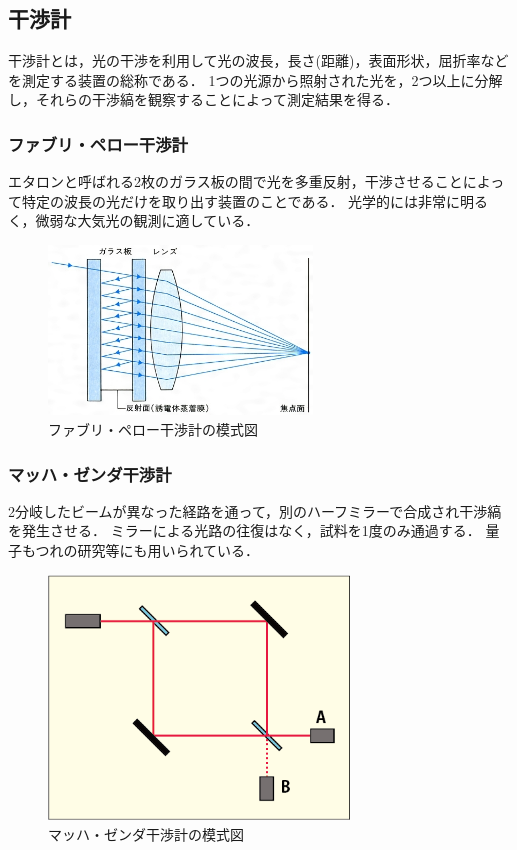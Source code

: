 \documentclass[a4paper]{ltjsarticle}
\begin{document}
	\subsection{干渉計}
		干渉計とは，光の干渉を利用して光の波長，長さ(距離)，表面形状，屈折率などを測定する装置の総称である．
		1つの光源から照射された光を，2つ以上に分解し，それらの干渉縞を観察することによって測定結果を得る．\cite{interference}
		\subsubsection{ファブリ・ペロー干渉計}
			エタロンと呼ばれる2枚のガラス板の間で光を多重反射，干渉させることによって特定の波長の光だけを取り出す装置のことである．
			光学的には非常に明るく，微弱な大気光の観測に適している．
			\begin{figure}[H]
				\centering
				\includegraphics[width=7cm]{fabry.jpg}
				\caption{ファブリ・ペロー干渉計の模式図}
			\end{figure}
		\subsubsection{マッハ・ゼンダ干渉計}
			2分岐したビームが異なった経路を通って，別のハーフミラーで合成され干渉縞を発生させる．
			ミラーによる光路の往復はなく，試料を1度のみ通過する．
			量子もつれの研究等にも用いられている．\cite{mach}
			\begin{figure}[H]
				\centering
				\includegraphics[width=8cm]{mach.png}
				\caption{マッハ・ゼンダ干渉計の模式図}
			\end{figure}
				
\end{document}
